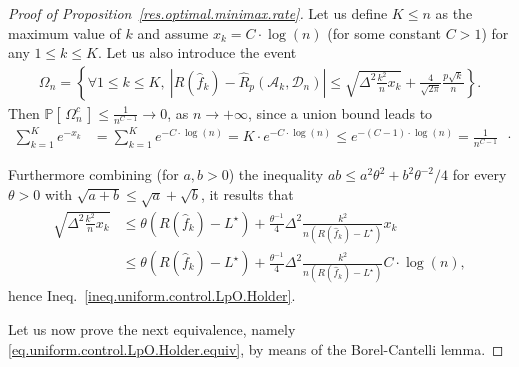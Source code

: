 \documentclass[twoside,11pt]{article}
\numberwithin{equation}{section}
\newcommand{\1}{\mathds{1}}%
\newcommand{\paren}[1]{\left( #1 \right)}
\newcommand{\croch}[1]{\left[\, #1 \,\right]}
\newcommand{\acc}[1]{\left\{ #1 \right\}}
\newcommand{\abs}[1]{\left\lvert #1 \right\rvert} %
\renewcommand{\P}{\mathbb{P}}
\newcommand{\Rh}{\widehat{R}}
\newcommand{\Rhp}{\Rh_p}
\newcommand{\Dn}{\mathcal{D}_n}
\newcommand{\A}{\mathcal{A}}
\numberwithin{equation}{section}
\theoremstyle{plain}
\begin{document}
\begin{proof}[Proof of Proposition~\ref{res.optimal.minimax.rate}]
%
Let us define $K\leq n$ as the maximum value of $k$ and assume $x_k = C \cdot \log(n)$ (for some constant $C>1$) for any $1\leq k\leq K$.
%
Let us also introduce the event
\begin{align*}
\Omega_n = \acc{ \forall 1\leq k\leq K,\  \abs{ R(\hat{f}_k) - \Rhp(\A_k,\Dn) } \leq \sqrt{ \Delta^2 \frac{k^2}{n} x_k } + \frac{4}{\sqrt{2\pi} } \frac{p\sqrt{k}}{n} }.
\end{align*}
%
Then $\P\croch{ \Omega_n^c  } \leq \frac{1}{n^{C-1}} \to 0$, as $n\to +\infty$, since a union bound leads to
	\begin{align*}
	\sum_{k=1}^K e^{-x_k} & = \sum_{k=1}^K e^{-C \cdot \log(n) }  = K \cdot e^{-C \cdot \log(n) } \leq  e^{- (C-1) \cdot \log(n) }  = \frac{1}{n^{C-1}} \enspace \cdot
	\end{align*}


Furthermore combining (for $a,b>0$) the inequality $ab \leq a^2 \theta^2  + b^2 \theta^{-2}/4 $ for every $\theta>0$ with $\sqrt{a+b}\leq \sqrt{a}+\sqrt{b}$, it results that
\begin{align*}
\sqrt{ \Delta^2 \frac{k^2}{n} x_k } & \leq \theta \paren{R(\hat{f}_k) - L^\star} + \frac{\theta^{-1}}{4} \Delta^2 \frac{k^2}{n\paren{R(\hat{f}_k) - L^\star}} x_k \\
%
& \leq \theta \paren{R(\hat{f}_k) - L^\star} + \frac{\theta^{-1}}{4} \Delta^2 \frac{k^2}{n\paren{R(\hat{f}_k) - L^\star}} C \cdot \log(n) ,
\end{align*}
hence Ineq.~\eqref{ineq.uniform.control.LpO.Holder}.

\medskip

 {Let us now prove the next equivalence, namely \eqref{eq.uniform.control.LpO.Holder.equiv}, by means of the Borel-Cantelli lemma.}


\end{proof}
\end{document}
